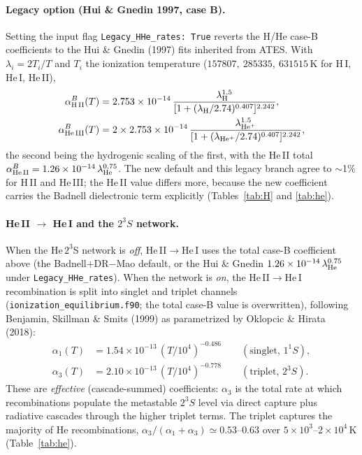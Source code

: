 \documentclass[english,a4paper]{my_memo}
\begin{document}
\paragraph{Legacy option (Hui \& Gnedin 1997, case B).} Setting the input flag
\texttt{Legacy\_HHe\_rates: True} reverts the H/He case-B coefficients to the
Hui \& Gnedin (1997) fits inherited from ATES. With $\lambda_i = 2 T_i/T$ and
$T_i$ the ionization temperature ($157807,\ 285335,\ 631515\,$K for H\,I, He\,I,
He\,II),
\begin{align}
\alpha_{\rm H\,II}^{B}(T) &= 2.753\times10^{-14}\,
   \frac{\lambda_{\rm H}^{1.5}}{[1+(\lambda_{\rm H}/2.74)^{0.407}]^{2.242}}, \\
\alpha_{\rm He\,III}^{B}(T) &= 2\times 2.753\times10^{-14}\,
   \frac{\lambda_{\rm He^+}^{1.5}}{[1+(\lambda_{\rm He^+}/2.74)^{0.407}]^{2.242}},
\end{align}
the second being the hydrogenic scaling of the first, with the He\,II total
$\alpha_{\rm He\,II}^{B}=1.26\times10^{-14}\,\lambda_{\rm He}^{0.75}$. The new
default and this legacy branch agree to $\sim$1\% for H\,II and He\,III; the
He\,II value differs more, because the new coefficient carries the Badnell
dielectronic term explicitly (Tables~\ref{tab:H} and \ref{tab:he}).

\paragraph{He\,II $\to$ He\,I and the $2^3S$ network.} When the He\,$2^3$S
network is \emph{off}, He\,II$\to$He\,I uses the total case-B coefficient
above (the Badnell$+$DR$-$Mao default, or the Hui \& Gnedin
$1.26\times10^{-14}\,\lambda_{\rm He}^{0.75}$ under \texttt{Legacy\_HHe\_rates}).
When the network is \emph{on}, the He\,II$\to$He\,I recombination is split
into singlet and triplet channels (\texttt{ionization\_equilibrium.f90};
the total case-B value is overwritten), following Benjamin, Skillman \&
Smits (1999) as parametrized by Oklopcic \& Hirata (2018):
\begin{align}
\alpha_{1}(T) &= 1.54\times10^{-13}\,(T/10^4)^{-0.486}
   \qquad(\text{singlet, }1^1S),\\
\alpha_{3}(T) &= 2.10\times10^{-13}\,(T/10^4)^{-0.778}
   \qquad(\text{triplet, }2^3S).
\end{align}
These are \emph{effective} (cascade-summed) coefficients: $\alpha_3$ is
the total rate at which recombinations populate the metastable $2^3S$
level via direct capture plus radiative cascades through the higher
triplet terms. The triplet captures the majority of He recombinations,
$\alpha_3/(\alpha_1+\alpha_3)\simeq0.53$--$0.63$ over
$5\times10^3$--$2\times10^4\,$K (Table~\ref{tab:he}).
\end{document}
